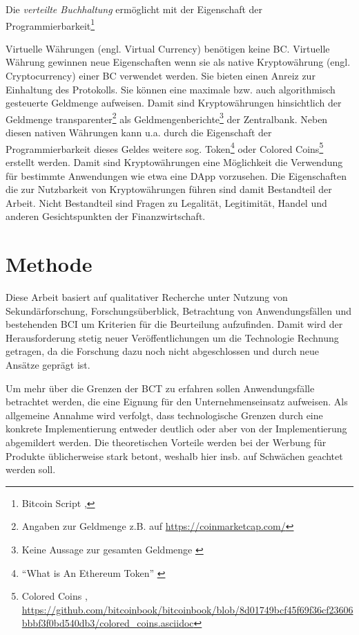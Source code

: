 Die \emph{verteilte Buchhaltung} ermöglicht mit der Eigenschaft der Programmierbarkeit\footnote{Bitcoin Script \autocite{w:btcwiki-script}, } 

Virtuelle Währungen (engl. Virtual Currency) benötigen keine \gls{BC}.
Virtuelle Währung gewinnen neue Eigenschaften wenn sie als native Kryptowährung (engl. Cryptocurrency) einer \gls{BC} verwendet werden. Sie bieten einen Anreiz zur Einhaltung des Protokolls. Sie können eine maximale bzw. auch algorithmisch gesteuerte Geldmenge aufweisen. %
Damit sind Kryptowährungen hinsichtlich der Geldmenge transparenter\footnote{Angaben zur Geldmenge z.B. auf \url{https://coinmarketcap.com/}} als Geldmengenberichte\footnote{Keine Aussage zur gesamten Geldmenge \autocite{w:ecb-moneydev}} der Zentralbank.
Neben diesen nativen Währungen kann u.a. durch die Eigenschaft der Programmierbarkeit dieses Geldes weitere sog. Token\footnote{\enquote{What is An Ethereum Token} \autocite{w:eth-token}} oder Colored Coins\footnote{Colored Coins \autocite{b:mastering-bitcoin}, \url{https://github.com/bitcoinbook/bitcoinbook/blob/8d01749bcf45f69f36cf23606bbbf3f0bd540db3/colored_coins.asciidoc}} erstellt werden. Damit sind Kryptowährungen eine Möglichkeit die Verwendung für bestimmte Anwendungen wie etwa eine \gls{DApp} vorzusehen.
Die Eigenschaften die zur Nutzbarkeit von Kryptowährungen führen sind damit Bestandteil der Arbeit. Nicht Bestandteil sind Fragen zu Legalität, Legitimität, Handel und anderen Gesichtspunkten der Finanzwirtschaft.


\section{Methode}

Diese Arbeit basiert auf qualitativer Recherche unter Nutzung von Sekundärforschung, Forschungsüberblick, Betrachtung von Anwendungsfällen und bestehenden \gls{BCI} um Kriterien für die Beurteilung aufzufinden.
Damit wird der Herausforderung stetig neuer Veröffentlichungen um die Technologie Rechnung getragen, da die Forschung dazu noch nicht abgeschlossen und durch neue Ansätze geprägt ist. 

Um mehr über die Grenzen der \gls{BCT} zu erfahren sollen Anwendungsfälle betrachtet werden, die eine Eignung für den Unternehmenseinsatz aufweisen.
Als allgemeine Annahme wird verfolgt, dass technologische Grenzen durch eine konkrete Implementierung entweder deutlich oder aber von der Implementierung abgemildert werden. %
Die theoretischen Vorteile werden bei der Werbung für Produkte üblicherweise stark betont, weshalb hier insb. auf Schwächen geachtet werden soll.

